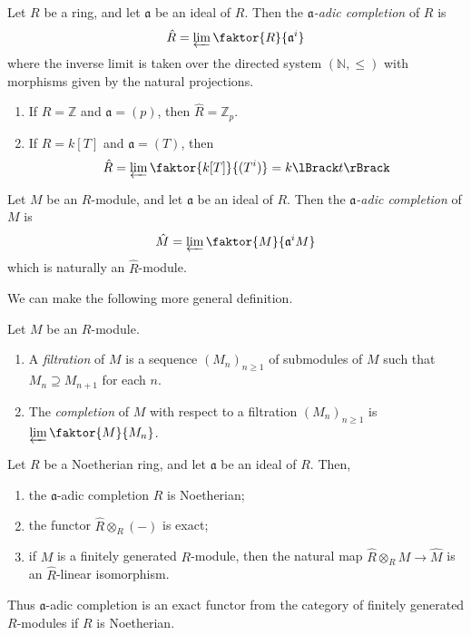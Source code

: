 \begin{definition}
    Let \( R \) be a ring, and let \( \mathfrak a \) be an ideal of \( R \).
    Then the \emph{\( \mathfrak a \)-adic completion} of \( R \) is
    \[ \hat R = \varprojlim \faktor{R}{\mathfrak a^i} \]
    where the inverse limit is taken over the directed system \( (\mathbb N, \leq) \) with morphisms given by the natural projections.
\end{definition}
\begin{example}
    \begin{enumerate}
        \item If \( R = \mathbb Z \) and \( \mathfrak a = (p) \), then \( \hat R = \mathbb Z_p \).
        \item If \( R = k[T] \) and \( \mathfrak a = (T) \), then
        \[ \hat R = \varprojlim \faktor{k[T]}{(T^i)} = k\Brackets{t} \]
    \end{enumerate}
\end{example}
\begin{definition}
    Let \( M \) be an \( R \)-module, and let \( \mathfrak a \) be an ideal of \( R \).
    Then the \emph{\( \mathfrak a \)-adic completion} of \( M \) is
    \[ \hat M = \varprojlim \faktor{M}{\mathfrak a^i M} \]
    which is naturally an \( \hat R \)-module.
\end{definition}
We can make the following more general definition.
\begin{definition}
    Let \( M \) be an \( R \)-module.
    \begin{enumerate}
        \item A \emph{filtration} of \( M \) is a sequence \( (M_n)_{n \geq 1} \) of submodules of \( M \) such that \( M_n \supseteq M_{n+1} \) for each \( n \).
        \item The \emph{completion} of \( M \) with respect to a filtration \( (M_n)_{n \geq 1} \) is \( \varprojlim \faktor{M}{M_n} \).
    \end{enumerate}
\end{definition}
\begin{theorem}
    Let \( R \) be a Noetherian ring, and let \( \mathfrak a \) be an ideal of \( R \).
    Then,
    \begin{enumerate}
        \item the \( \mathfrak a \)-adic completion \( \hat R \) is Noetherian;
        \item the functor \( \hat R \otimes_R (-) \) is exact;
        \item if \( M \) is a finitely generated \( R \)-module, then the natural map \( \hat R \otimes_R M \to \hat M \) is an \( \hat R \)-linear isomorphism. 
    \end{enumerate}
\end{theorem}
Thus \( \mathfrak a \)-adic completion is an exact functor from the category of finitely generated \( R \)-modules if \( R \) is Noetherian.
